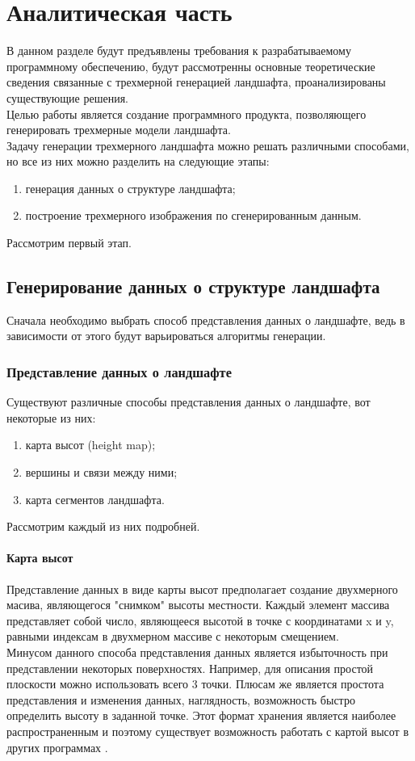 \documentclass{article}
\begin{document}
	\section{Аналитическая часть}
	В данном разделе будут предъявлены требования к разрабатываемому программному обеспечению, будут рассмотренны основные теоретические сведения связанные с трехмерной генерацией ландшафта, проанализированы существующие решения.
\\ \indent
	Целью работы является создание программного продукта, позволяющего генерировать трехмерные модели ландшафта.
\\ \indent
	Задачу генерации трехмерного ландшафта можно решать различными способами, но все из них можно разделить на следующие этапы:
	\begin{enumerate}
		\item генерация данных о структуре ландшафта;
		\item построение трехмерного изображения по сгенерированным данным.
	\end{enumerate}
	Рассмотрим первый этап.
	\subsection{Генерирование данных о структуре ландшафта}
	Сначала необходимо выбрать способ представления данных о ландшафте, ведь в зависимости от этого будут варьироваться алгоритмы генерации.
	\subsubsection{Представление данных о ландшафте}
	\indent Существуют различные способы представления данных о ландшафте, вот некоторые из них:
           \begin{enumerate}
		\item карта высот (height map);
		\item вершины и связи между ними;
		\item карта сегментов ландшафта.
	\end{enumerate}
	Рассмотрим каждый из них подробней.
	\paragraph{Карта высот}
	\indent Представление данных в виде карты высот предполагает создание двухмерного масива, являющегося "снимком" высоты местности. Каждый элемент массива представляет собой число, являющееся высотой в точке с координатами x и y, равными индексам в двухмерном массиве с некоторым смещением. \\
	\indent Минусом данного способа представления данных является избыточность при представлении некоторых поверхностях. Например, для описания простой плоскости можно использовать всего 3 точки. Плюсам же является простота представления и изменения данных, наглядность, возможность быстро определить высоту в заданной точке. Этот формат хранения является наиболее распространенным и поэтому существует возможность работать с картой высот в других программах \cite{height-map}.
\end{document}

